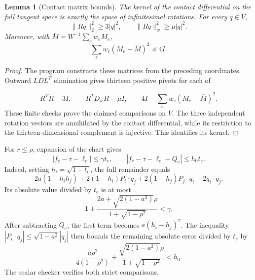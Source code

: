 \documentclass[12pt,reqno]{amsart}
\newtheorem{lemma}[theorem]{Lemma}
\theoremstyle{definition}
\numberwithin{equation}{section}
\begin{document}
\begin{lemma}[Contact matrix bounds]\label{geo:spectrum}
The kernel of the contact differential on the full tangent space is
exactly the space of infinitesimal rotations. For every $q\in V$,
\[
 \|Rq\|_2^2\ge3|q|^2,\qquad \|Rq\|_w^2\ge\mu|q|^2.
\]
Moreover, with $\bar M=W^{-1}\sum_ew_eM_e$,
\begin{equation}\label{geo:variancegram}
 \sum_ew_e(M_e-\bar M)^2\preceq4I.
\end{equation}
\end{lemma}
\begin{proof}
{\raggedright
The program  constructs
these matrices from the preceding coordinates. Outward $LDL^T$
elimination gives thirteen positive pivots for each of\par}
\[
 R^TR-3I,\qquad R^TD_wR-\mu I,\qquad
 4I-\sum_ew_e(M_e-\bar M)^2.
\]
These finite checks prove the claimed comparisons on $V$.
The three independent rotation vectors are annihilated by the
contact differential, while its restriction to the thirteen-dimensional
complement is injective. This identifies its kernel.
\end{proof}

For $r\le\rho$, expansion of the chart gives
\begin{equation}\label{geo:remainders}
 |f_e-\tau-\ell_e|\le\gamma t_e,
 \qquad |f_e-\tau-\ell_e-Q_e|\le h_0t_e.
\end{equation}
Indeed, setting $h_i=\sqrt{1-t_i}$, the full remainder equals
\[
 2a(1-h_ih_j)+2(1-h_i)P_i\cdot q_j
 +2(1-h_j)P_j\cdot q_i-2q_i\cdot q_j.
\]
Its absolute value divided by $t_e$ is at most
\[
 1+\frac{2a+\sqrt{2(1-a^2)}\rho}{1+\sqrt{1-\rho^2}}<\gamma.
\]
After subtracting $Q_e$, the first term becomes $a(h_i-h_j)^2$.
The inequality $|P_i\cdot q_j|\le\sqrt{1-a^2}|q_j|$ then bounds the
remaining absolute error divided by $t_e$ by
\[
 \frac{a\rho^2}{4(1-\rho^2)}+
 \frac{\sqrt{2(1-a^2)}\rho}{1+\sqrt{1-\rho^2}}<h_0.
\]
The scalar checker verifies both strict comparisons.
\end{document}
